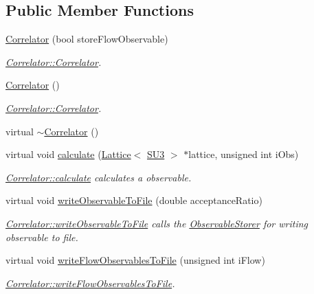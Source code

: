 \subsection*{Public Member Functions}
\begin{DoxyCompactItemize}
\item 
\mbox{\hyperlink{class_correlator_aff48ef3bf789e9c6231eacc21cd9ed9a}{Correlator}} (bool store\+Flow\+Observable)
\begin{DoxyCompactList}\small\item\em \mbox{\hyperlink{class_correlator_aff48ef3bf789e9c6231eacc21cd9ed9a}{Correlator\+::\+Correlator}}. \end{DoxyCompactList}\item 
\mbox{\hyperlink{class_correlator_a6114955836dba0b4b61138490cd3fe91}{Correlator}} ()
\begin{DoxyCompactList}\small\item\em \mbox{\hyperlink{class_correlator_aff48ef3bf789e9c6231eacc21cd9ed9a}{Correlator\+::\+Correlator}}. \end{DoxyCompactList}\item 
virtual \mbox{\hyperlink{class_correlator_a48307431ca91b41319c6b68c6684634d}{$\sim$\+Correlator}} ()
\item 
virtual void \mbox{\hyperlink{class_correlator_ab33502ff305f891c5c2e6d66a26a0247}{calculate}} (\mbox{\hyperlink{class_lattice}{Lattice}}$<$ \mbox{\hyperlink{class_s_u3}{S\+U3}} $>$ $\ast$lattice, unsigned int i\+Obs)
\begin{DoxyCompactList}\small\item\em \mbox{\hyperlink{class_correlator_ab33502ff305f891c5c2e6d66a26a0247}{Correlator\+::calculate}} calculates a observable. \end{DoxyCompactList}\item 
virtual void \mbox{\hyperlink{class_correlator_a9e8d80e30e4fbe3b7fe57521538cb5ff}{write\+Observable\+To\+File}} (double acceptance\+Ratio)
\begin{DoxyCompactList}\small\item\em \mbox{\hyperlink{class_correlator_a9e8d80e30e4fbe3b7fe57521538cb5ff}{Correlator\+::write\+Observable\+To\+File}} calls the \mbox{\hyperlink{class_observable_storer}{Observable\+Storer}} for writing observable to file. \end{DoxyCompactList}\item 
virtual void \mbox{\hyperlink{class_correlator_a168512b2ce182d9478db47f100125fa6}{write\+Flow\+Observables\+To\+File}} (unsigned int i\+Flow)
\begin{DoxyCompactList}\small\item\em \mbox{\hyperlink{class_correlator_a168512b2ce182d9478db47f100125fa6}{Correlator\+::write\+Flow\+Observables\+To\+File}}. \end{DoxyCompactList}\item 

\end{DoxyCompactItemize}
